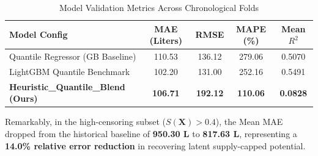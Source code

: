 \documentclass[11pt,a4paper]{article}
\theoremstyle{definition}
\begin{document}
\begin{table}[h]
    \centering
    \caption{Model Validation Metrics Across Chronological Folds}
    \begin{tabular}{lcccc}
        \toprule
        \textbf{Model Config} & \textbf{MAE (Liters)} & \textbf{RMSE} & \textbf{MAPE (\%)} & \textbf{Mean $R^2$} \\
        \midrule
        Quantile Regressor (GB Baseline) & 110.53 & 136.12 & 279.06 & 0.5070 \\
        LightGBM Quantile Benchmark & 102.20 & 131.00 & 252.16 & 0.5491 \\
        \textbf{Heuristic\_Quantile\_Blend (Ours)} & \textbf{106.71} & \textbf{192.12} & \textbf{110.06} & \textbf{0.0828} \\
        \bottomrule
    \end{tabular}
\end{table}

Remarkably, in the high-censoring subset ($S(\bm{X}) > 0.4$), the Mean MAE dropped from the historical baseline of \textbf{950.30 L} to \textbf{817.63 L}, representing a \textbf{14.0\% relative error reduction} in recovering latent supply-capped potential.
\end{document}
